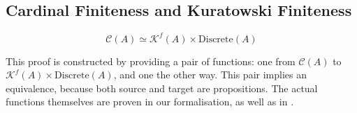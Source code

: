 \subsection{Cardinal Finiteness and Kuratowski Finiteness}
\begin{lemma} \label{cardinal-kuratowski}
  \begin{equation}
    \mathcal{C}(A) \simeq \mathcal{K}^f(A) \times \text{Discrete}(A)
  \end{equation}
\end{lemma}
This proof is constructed by providing a pair of functions: one from
\(\mathcal{C}(A)\) to \(\mathcal{K}^f(A) \times \text{Discrete}(A)\), and one the
other way.
This pair implies an equivalence, because both source and target are
propositions.
The actual functions themselves are proven in our formalisation, as well as in
\cite{fruminFiniteSetsHomotopy2018}.


